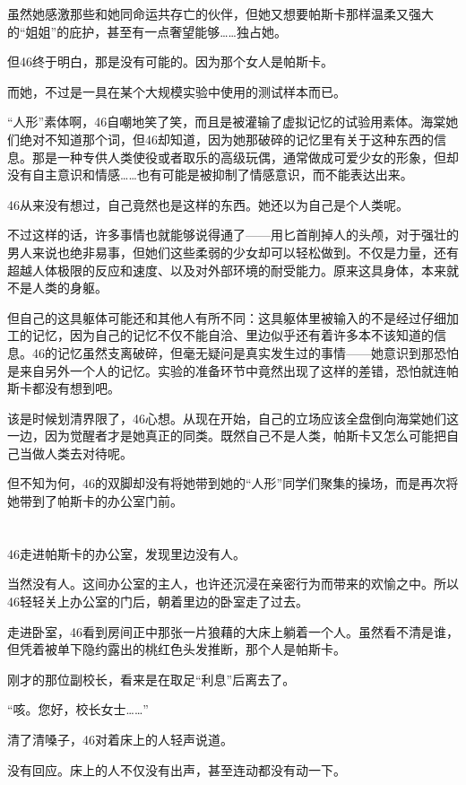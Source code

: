 虽然她感激那些和她同命运共存亡的伙伴，但她又想要帕斯卡那样温柔又强大的“姐姐”的庇护，甚至有一点奢望能够……独占她。

但46终于明白，那是没有可能的。因为那个女人是帕斯卡。

而她，不过是一具在某个大规模实验中使用的测试样本而已。

 “人形”素体啊，46自嘲地笑了笑，而且是被灌输了虚拟记忆的试验用素体。海棠她们绝对不知道那个词，但46却知道，因为她那破碎的记忆里有关于这种东西的信息。那是一种专供人类使役或者取乐的高级玩偶，通常做成可爱少女的形象，但却没有自主意识和情感……也有可能是被抑制了情感意识，而不能表达出来。

46从来没有想过，自己竟然也是这样的东西。她还以为自己是个人类呢。

不过这样的话，许多事情也就能够说得通了——用匕首削掉人的头颅，对于强壮的男人来说也绝非易事，但她们这些柔弱的少女却可以轻松做到。不仅是力量，还有超越人体极限的反应和速度、以及对外部环境的耐受能力。原来这具身体，本来就不是人类的身躯。

但自己的这具躯体可能还和其他人有所不同：这具躯体里被输入的不是经过仔细加工的记忆，因为自己的记忆不仅不能自洽、里边似乎还有着许多本不该知道的信息。46的记忆虽然支离破碎，但毫无疑问是真实发生过的事情——她意识到那恐怕是来自另外一个人的记忆。实验的准备环节中竟然出现了这样的差错，恐怕就连帕斯卡都没有想到吧。

该是时候划清界限了，46心想。从现在开始，自己的立场应该全盘倒向海棠她们这一边，因为觉醒者才是她真正的同类。既然自己不是人类，帕斯卡又怎么可能把自己当做人类去对待呢。

但不知为何，46的双脚却没有将她带到她的“人形”同学们聚集的操场，而是再次将她带到了帕斯卡的办公室门前。

\section*{}

46走进帕斯卡的办公室，发现里边没有人。

当然没有人。这间办公室的主人，也许还沉浸在亲密行为而带来的欢愉之中。所以46轻轻关上办公室的门后，朝着里边的卧室走了过去。

走进卧室，46看到房间正中那张一片狼藉的大床上躺着一个人。虽然看不清是谁，但凭着被单下隐约露出的桃红色头发推断，那个人是帕斯卡。

刚才的那位副校长，看来是在取足“利息”后离去了。

“咳。您好，校长女士……”

清了清嗓子，46对着床上的人轻声说道。

没有回应。床上的人不仅没有出声，甚至连动都没有动一下。

